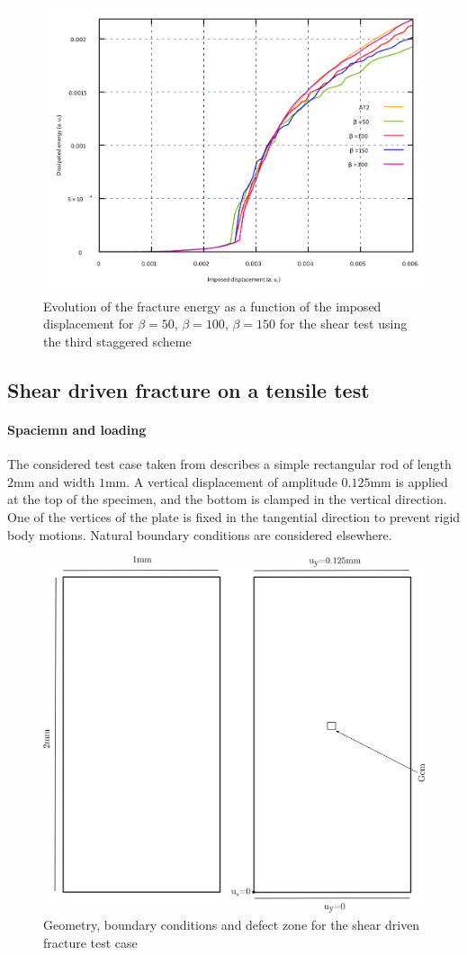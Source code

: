 \begin{figure}[H]
  \centering
  \includegraphics[width=10.cm]{../chapter_003_ef_micromorphic/figures/DissipatedEnergies.pdf}
  \caption{Evolution of the fracture energy as a function of the imposed
  displacement for \(\beta=50\), \(\beta=100\), \(\beta=150\) for the
  shear test using the third staggered
  scheme}
  \label{fig:micromorphic_damage:beta2}
\end{figure}

\subsection{Shear driven fracture on a tensile test}

\paragraph{Spaciemn and loading}

The considered test case taken from \cite{alessi_phase-field_2020} describes a simple rectangular rod
of length $2$mm and width $1$mm.
A vertical displacement of amplitude $0.125$mm is applied at the top of the specimen, and the
bottom is clamped in the vertical direction.
One of the vertices
of the plate is fixed in the tangential direction to prevent rigid body motions.
Natural
boundary conditions are considered elsewhere.

\begin{figure}[H]
  \centering
  \includegraphics[width=8.cm]{../chapter_003_ef_micromorphic/drawings/alessi_mesh.png}
  \caption{Geometry, boundary conditions and defect zone for the shear driven fracture test case}
  \label{fig:micromorphic_damage:alessi_mesh}
\end{figure}

